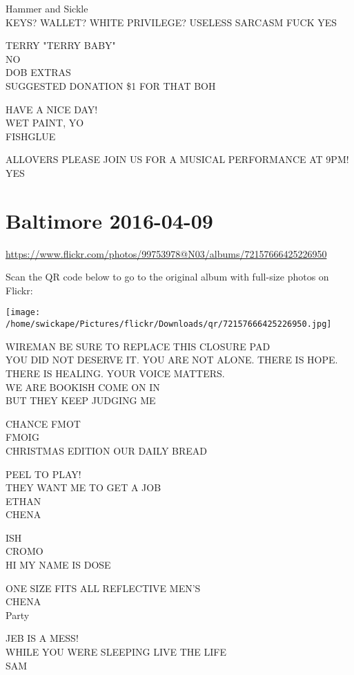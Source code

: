 \documentclass[10pt,letterpaper]{article}
\begin{document}
Hammer and Sickle\\
KEYS?  WALLET?  WHITE PRIVILEGE?  USELESS SARCASM FUCK YES

TERRY "TERRY BABY"\\
NO\\
DOB EXTRAS\\
SUGGESTED DONATION \$1 FOR THAT BOH

HAVE A NICE DAY!\\
WET PAINT, YO\\
FISHGLUE

ALLOVERS PLEASE JOIN US FOR A MUSICAL PERFORMANCE AT 9PM!\\
YES
\pagebreak

\section*{Baltimore 2016-04-09}

\url{https://www.flickr.com/photos/99753978@N03/albums/72157666425226950}

Scan the QR code below to go to the original album with full-size photos on Flickr:

\texttt{[image: /home/swickape/Pictures/flickr/Downloads/qr/72157666425226950.jpg]}
\pagebreak

WIREMAN BE SURE TO REPLACE THIS CLOSURE PAD\\
YOU DID NOT DESERVE IT. YOU ARE NOT ALONE. THERE IS HOPE. THERE IS HEALING. YOUR VOICE MATTERS.\\
WE ARE BOOKISH COME ON IN\\
BUT THEY KEEP JUDGING ME

CHANCE FMOT\\
FMOIG\\
CHRISTMAS EDITION OUR DAILY BREAD

PEEL TO PLAY!\\
THEY WANT ME TO GET A JOB\\
ETHAN\\
CHENA

ISH\\
CROMO\\
HI MY NAME IS DOSE

ONE SIZE FITS ALL REFLECTIVE MEN'S\\
CHENA\\
Party

JEB IS A MESS!\\
WHILE YOU WERE SLEEPING LIVE THE LIFE\\
SAM
\end{document}
